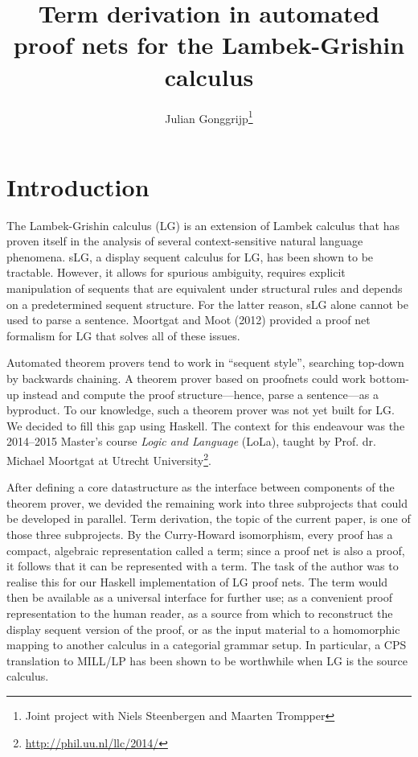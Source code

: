 \documentclass[12pt,a4paper]{article}
\begin{document}
\title{Term derivation in automated proof nets for the Lambek-Grishin calculus}
\author{Julian Gonggrijp\thanks{Joint project with Niels Steenbergen and Maarten Trompper}}
\date{}
\maketitle


\section{Introduction}

The Lambek-Grishin calculus (LG) is an extension of Lambek calculus that has proven itself in the analysis of several context-sensitive natural language phenomena. sLG, a display sequent calculus for LG, has been shown to be tractable. \cite{m09} However, it allows for spurious ambiguity, requires explicit manipulation of sequents that are equivalent under structural rules and depends on a predetermined sequent structure. For the latter reason, sLG alone cannot be used to parse a sentence. Moortgat and Moot (2012) provided a proof net formalism for LG that solves all of these issues. \cite{mm12}

Automated theorem provers tend to work in ``sequent style'', searching top-down by backwards chaining. A theorem prover based on proofnets could work bottom-up instead and compute the proof structure---hence, parse a sentence---as a byproduct. To our knowledge, such a theorem prover was not yet built for LG. We decided to fill this gap using Haskell. The context for this endeavour was the 2014--2015 Master's course \emph{Logic and Language} (LoLa), taught by Prof. dr. Michael Moortgat at Utrecht University\footnote{\url{http://phil.uu.nl/llc/2014/}}.

After defining a core datastructure as the interface between components of the theorem prover, we devided the remaining work into three subprojects that could be developed in parallel. Term derivation, the topic of the current paper, is one of those three subprojects. By the Curry-Howard isomorphism, every proof has a compact, algebraic representation called a term; since a proof net is also a proof, it follows that it can be represented with a term. The task of the author was to realise this for our Haskell implementation of LG proof nets. The term would then be available as a universal interface for further use; as a convenient proof representation to the human reader, as a source from which to reconstruct the display sequent version of the proof, or as the input material to a homomorphic mapping to another calculus in a categorial grammar setup. In particular, a CPS translation to MILL/LP has been shown to be worthwhile when LG is the source calculus. \cite{mm12}
\end{document}
